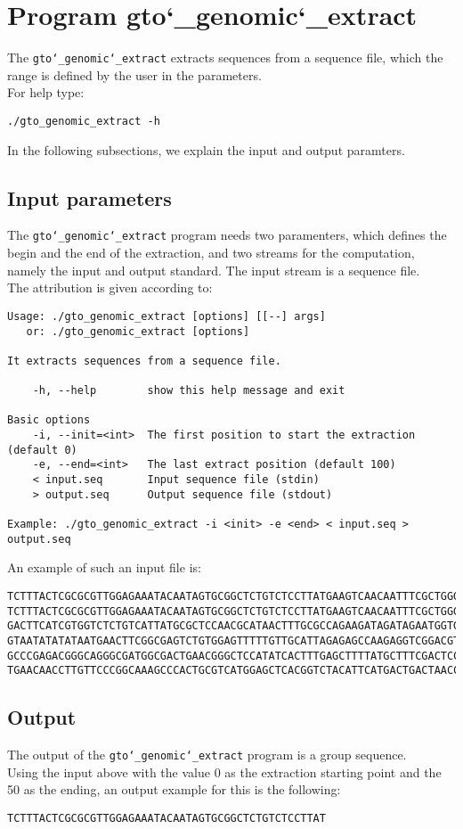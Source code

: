 \section{Program gto\char`_genomic\char`_extract}
The \texttt{gto\char`_genomic\char`_extract} extracts sequences from a sequence file, which the range is defined by the user in the parameters.\\
For help type:
\begin{lstlisting}
./gto_genomic_extract -h
\end{lstlisting}
In the following subsections, we explain the input and output paramters.

\subsection*{Input parameters}

The \texttt{gto\char`_genomic\char`_extract} program needs two paramenters, which defines the begin and the end of the extraction, and two streams for the computation, namely the input and output standard. The input stream is a sequence file.\\
The attribution is given according to:
\begin{lstlisting}
Usage: ./gto_genomic_extract [options] [[--] args]
   or: ./gto_genomic_extract [options]

It extracts sequences from a sequence file.

    -h, --help        show this help message and exit

Basic options
    -i, --init=<int>  The first position to start the extraction (default 0)
    -e, --end=<int>   The last extract position (default 100)
    < input.seq       Input sequence file (stdin)
    > output.seq      Output sequence file (stdout)

Example: ./gto_genomic_extract -i <init> -e <end> < input.seq > output.seq
\end{lstlisting}
An example of such an input file is:
\begin{lstlisting}
TCTTTACTCGCGCGTTGGAGAAATACAATAGTGCGGCTCTGTCTCCTTATGAAGTCAACAATTTCGCTGGGACTTGCGGC
TCTTTACTCGCGCGTTGGAGAAATACAATAGTGCGGCTCTGTCTCCTTATGAAGTCAACAATTTCGCTGGGACTTGCGGC
GACTTCATCGTGGTCTCTGTCATTATGCGCTCCAACGCATAACTTTGCGCCAGAAGATAGATAGAATGGTGTAAGAAACT
GTAATATATATAATGAACTTCGGCGAGTCTGTGGAGTTTTTGTTGCATTAGAGAGCCAAGAGGTCGGACGTCCTCACGTA
GCCCGAGACGGGCAGGGCGATGGCGACTGAACGGGCTCCATATCACTTTGAGCTTTTATGCTTTCGACTCCTCCAGGAGC
TGAACAACCTTGTTCCCGGCAAAGCCCACTGCGTCATGGAGCTCACGGTCTACATTCATGACTGACTAACCGTAAACTGC
\end{lstlisting}

\subsection*{Output}
The output of the \texttt{gto\char`_genomic\char`_extract} program is a group sequence.\\
Using the input above with the value 0 as the extraction starting point and the 50 as the ending, an output example for this is the following:
\begin{lstlisting}
TCTTTACTCGCGCGTTGGAGAAATACAATAGTGCGGCTCTGTCTCCTTAT
\end{lstlisting}